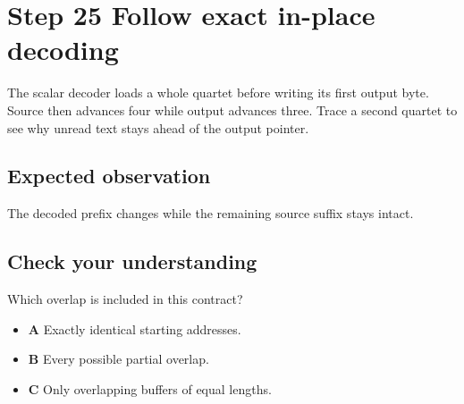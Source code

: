 \section{Step 25 Follow exact in-place decoding}\label{base64-s25}

The scalar decoder loads a whole quartet before writing its first output byte. Source then advances four while output advances three. Trace a second quartet to see why unread text stays ahead of the output pointer.

\subsection{Expected observation}
The decoded prefix changes while the remaining source suffix stays intact.

\subsection{Check your understanding}
Which overlap is included in this contract?

\begin{itemize}
  \item \textbf{A} Exactly identical starting addresses.
  \item \textbf{B} Every possible partial overlap.
  \item \textbf{C} Only overlapping buffers of equal lengths.
\end{itemize}
